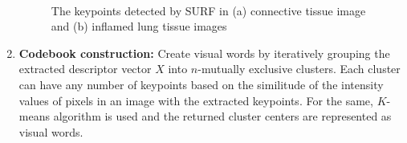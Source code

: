 \begin{enumerate}
\begin{figure}
\centering
    ~~~~~
 \caption[The keypoints detected by SURF in connective tissue and inflamed lung histopathological images]{ \fontsize{10}{12}\selectfont The keypoints detected by SURF in (a) connective tissue image and (b) inflamed lung tissue images}
\label{ch3:fig:kp}
\end{figure}

\item\textbf{Codebook construction:} Create visual words by iteratively grouping the extracted descriptor vector $X$ into $n$-mutually exclusive clusters. Each cluster can have any number of keypoints based on the similitude of the intensity values of pixels in an image with the extracted keypoints. For the same, $K$-means algorithm is used and the returned cluster centers are represented as visual words.  


\end{enumerate}
